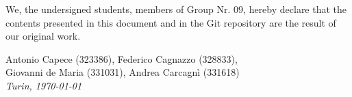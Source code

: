 \documentclass[a4paper, 10pt, oneside]{article} %
\begin{document}
\bigskip

We, the undersigned students, members of Group Nr. 09, hereby declare that the contents presented in this document and in the Git repository are the result of our original work. 
\begin{flushleft}
Antonio Capece (323386), Federico Cagnazzo (328833),\\
Giovanni de Maria (331031), Andrea Carcagnì (331618)\\


\textit{Turin, \today}
\end{flushleft}
\end{document}
